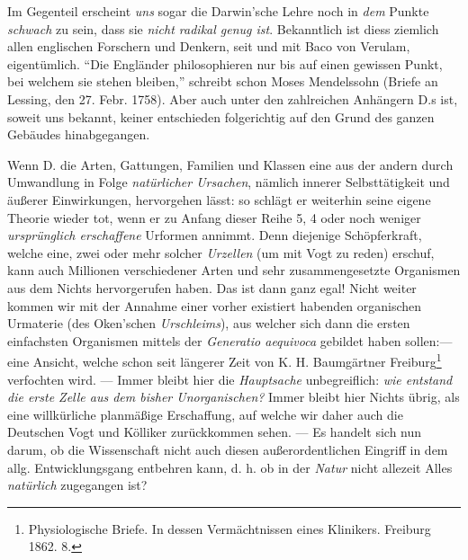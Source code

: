 \documentclass[a4paper, 11pt, oneside, english]{article}
\begin{document}
Im Gegenteil erscheint \emph{uns} sogar die Darwin'sche Lehre noch in \emph{dem} Punkte \emph{schwach} zu sein, dass sie \emph{nicht radikal genug ist}. Bekanntlich ist diess ziemlich allen englischen Forschern und Denkern, seit und mit Baco von Verulam, eigentümlich. "`Die Engländer philosophieren nur bis auf einen gewissen Punkt, bei welchem sie stehen bleiben,"' schreibt schon Moses Mendelssohn (Briefe an Lessing, den 27. Febr. 1758). Aber auch unter den zahlreichen Anhängern D.s ist, soweit uns bekannt, keiner entschieden folgerichtig auf den Grund des ganzen Gebäudes hinabgegangen.

Wenn D. die Arten, Gattungen, Familien und Klassen eine aus der andern durch Umwandlung in Folge \emph{natürlicher Ursachen}, nämlich innerer Selbsttätigkeit und äußerer Einwirkungen, hervorgehen lässt: so schlägt er weiterhin seine eigene Theorie wieder tot, wenn er zu Anfang dieser Reihe 5, 4 oder noch weniger \emph{ursprünglich erschaffene} Urformen annimmt. Denn diejenige Schöpferkraft, welche eine, zwei oder mehr solcher \emph{Urzellen} (um mit Vogt zu reden) erschuf, kann auch Millionen verschiedener Arten und sehr zusammengesetzte Organismen aus dem Nichts hervorgerufen haben. Das ist dann ganz egal! Nicht weiter kommen wir mit der Annahme einer vorher existiert habenden organischen Urmaterie (des Oken'schen \emph{Urschleims}), aus welcher sich dann die ersten einfachsten Organismen mittels der \emph{Generatio aequivoca} gebildet haben sollen:--- eine Ansicht, welche schon seit längerer Zeit von K. H. Baumgärtner Freiburg\footnote{Physiologische Briefe. In dessen Vermächtnissen eines Klinikers. Freiburg 1862. 8.} verfochten wird. --- Immer bleibt hier die \emph{Hauptsache} unbegreiflich: \emph{wie entstand die erste Zelle aus dem bisher Unorganischen?} Immer bleibt hier Nichts übrig, als eine willkürliche planmäßige Erschaffung, auf welche wir daher auch die Deutschen Vogt und Kölliker zurückkommen sehen. --- Es handelt sich nun darum, ob die Wissenschaft nicht auch diesen außerordentlichen Eingriff in dem allg. Entwicklungsgang entbehren kann, d. h. ob in der \emph{Natur} nicht allezeit Alles \emph{natürlich} zugegangen ist?
\end{document}
